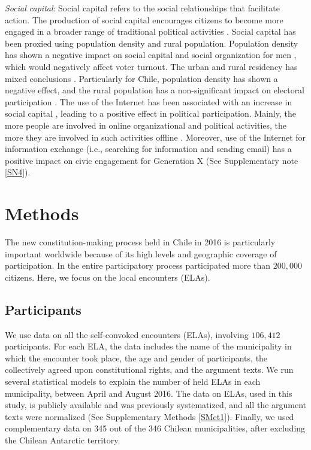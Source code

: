 \documentclass[onecolumn]{article}
\begin{document}
\textit{Social capital}: Social capital refers to the social relationships that facilitate action. The production of social capital encourages citizens to become more engaged in a broader range of traditional political activities \cite{ladua, klesner}. Social capital has been proxied using population density and rural population. Population density has shown a negative impact on social capital and social organization for men \cite{mccull}, which would negatively affect voter turnout. The urban and rural residency has mixed conclusions \cite{campbell,muller1970, hofferth}. Particularly for Chile, population density has shown a negative effect, and the rural population has a non-significant impact on electoral participation \cite{bargsted}.
The use of the Internet has been associated with an increase in social capital \cite{horrigan2001,v2001internet}, leading to a positive effect in political participation. Mainly, the more people are involved in online organizational and political activities, the more they are involved in such activities offline \cite{wellman2001}. Moreover, use of the Internet for information exchange (i.e., searching for information and sending email) has a positive impact on civic engagement\cite{v2001internet} for Generation X (See Supplementary note \ref{SN4}).


\section*{Methods}
\label{sec:data}

The new constitution-making process held in Chile in 2016 is particularly important worldwide because of its high levels and geographic coverage of participation. In the entire participatory process participated more than $200,000$ citizens. Here, we focus on the local encounters (ELAs).


\subsection*{Participants}
We use data on all the self-convoked encounters (ELAs), involving $106,412$ participants. For each ELA, the data includes the name of the municipality in which the encounter took place, the age and gender of participants, the collectively agreed upon constitutional rights, and the argument texts. We run several statistical models to explain the number of held ELAs in each municipality, between April and August 2016. The data on ELAs, used in this study, is publicly available and was previously systematized, and all the argument texts were normalized \cite{fierro2017} (See Supplementary Methods \ref{SMet1}). Finally, we used complementary data on 345 out of the 346 Chilean municipalities, after excluding the Chilean Antarctic territory. 
\end{document}
